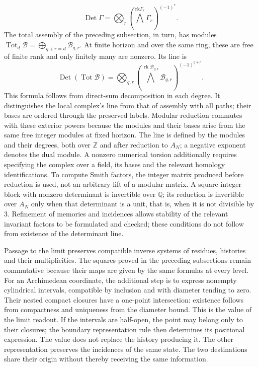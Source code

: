 \[
\operatorname{Det}\Gamma=
\bigotimes_r\left(\bigwedge^{\mathrm{rk}\Gamma_r}\Gamma_r\right)^{(-1)^r}.
\]
The total assembly of the preceding subsection, in turn, has modules \(\operatorname{Tot}_d\mathcal B=\bigoplus_{q+r=d}\mathcal B_{q,r}\). At finite horizon and over the same ring, these are free of finite rank and only finitely many are nonzero. Its line is
\[
\operatorname{Det}(\operatorname{Tot}\mathcal B)=
\bigotimes_{q,r}
\left(\bigwedge^{\operatorname{rk}\mathcal B_{q,r}}
\mathcal B_{q,r}\right)^{(-1)^{q+r}}.
\]
This formula follows from direct-sum decomposition in each degree. It distinguishes the local complex's line from that of assembly with all paths; their bases are ordered through the preserved labels. Modular reduction commutes with these exterior powers because the modules and their bases arise from the same free integer modules at fixed horizon.
The line is defined by the modules and their degrees, both over \(\mathbb Z\) and after reduction to \(A_N\); a negative exponent denotes the dual module. A nonzero numerical torsion additionally requires specifying the complex over a field, its bases and the relevant homology identifications. To compute Smith factors, the integer matrix produced before reduction is used, not an arbitrary lift of a modular matrix. A square integer block with nonzero determinant is invertible over \(\mathbb Q\); its reduction is invertible over \(A_N\) only when that determinant is a unit, that is, when it is not divisible by \(3\). Refinement of memories and incidences allows stability of the relevant invariant factors to be formulated and checked; these conditions do not follow from existence of the determinant line.

Passage to the limit preserves compatible inverse systems of residues, histories and their multiplicities. The squares proved in the preceding subsections remain commutative because their maps are given by the same formulas at every level. For an Archimedean coordinate, the additional step is to express nonempty cylindrical intervals, compatible by inclusion and with diameter tending to zero. Their nested compact closures have a one-point intersection: existence follows from compactness and uniqueness from the diameter bound. This is the value of the limit readout. If the intervals are half-open, the point may belong only to their closures; the boundary representation rule then determines its positional expression. The value does not replace the history producing it. The other representation preserves the incidences of the same state. The two destinations share their origin without thereby receiving the same information.


